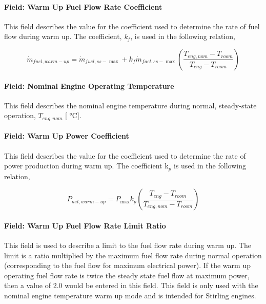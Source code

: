 \paragraph{Field: Warm Up Fuel Flow Rate Coefficient}\label{field-warm-up-fuel-flow-rate-coefficient}

This field describes the value for the coefficient used to determine the rate of fuel flow during warm up. The coefficient, \emph{k\(_{f}\)}, is used in the following relation,

\begin{equation}
{\dot m_{fuel,warm - up}} = {\dot m_{fuel,ss - \max }} + {k_f}{\dot m_{fuel,ss - \max }}\left( {\frac{{{T_{eng,nom}} - {T_{room}}}}{{{T_{eng}} - {T_{room}}}}} \right)
\end{equation}

\paragraph{Field: Nominal Engine Operating Temperature}\label{field-nominal-engine-operating-temperature}

This field describes the nominal engine temperature during normal, steady-state operation, \({T_{eng,nom}}\) {[} °C{]}.

\paragraph{Field: Warm Up Power Coefficient}\label{field-warm-up-power-coefficient}

This field describes the value for the coefficient used to determine the rate of power production during warm up. The coefficient k\(_{p}\) is used in the following relation,

\begin{equation}
{P_{net,warm - up}} = {P_{\max }}{k_p}\left( {\frac{{{T_{eng}} - {T_{room}}}}{{{T_{eng,nom}} - {T_{room}}}}} \right)
\end{equation}

\paragraph{Field: Warm Up Fuel Flow Rate Limit Ratio}\label{field-warm-up-fuel-flow-rate-limit-ratio}

This field is used to describe a limit to the fuel flow rate during warm up. The limit is a ratio multiplied by the maximum fuel flow rate during normal operation (corresponding to the fuel flow for maximum electrical power). If the warm up operating fuel flow rate is twice the steady state fuel flow at maximum power, then a value of 2.0 would be entered in this field. This field is only used with the nominal engine temperature warm up mode and is intended for Stirling engines.


